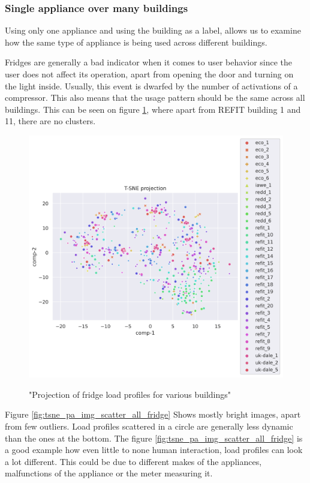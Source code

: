 \subsubsection{Single appliance over many buildings}

Using only one appliance and using the building as a label,
allows us to examine how the same type of appliance is being used across different buildings.

Fridges are generally a bad indicator when it comes to user behavior since the user does not affect 
its operation, apart from opening the door and turning on the light inside. 
Usually, this event is dwarfed by the number of activations of a compressor. 
This also means that the usage pattern should be the same across all buildings. 
This can be seen on figure \ref{fig:tsne_pa_scatter_all_fridge}, 
where apart from REFIT building 1 and 11, there are no clusters.

\begin{figure}[H]
	\centering
	\caption{"Projection of fridge load profiles for various buildings"}
	\includegraphics[width=1.2\textwidth]{Figures/TSNE/TSNE_per_appliance/all/scatter_all_fridge_freeezer_fridge freezer.png}
	\label{fig:tsne_pa_scatter_all_fridge}
\end{figure}

Figure \ref{fig:tsne_pa_img_scatter_all_fridge} Shows mostly bright images, apart from few outliers.
Load profiles scattered in a circle are generally less dynamic than the ones at the bottom.
The figure \ref{fig:tsne_pa_img_scatter_all_fridge} is a good example how even little to none human
interaction, load profiles can look a lot different. This could be due to different makes of the 
appliances, malfunctions of the appliance or the meter measuring it.

